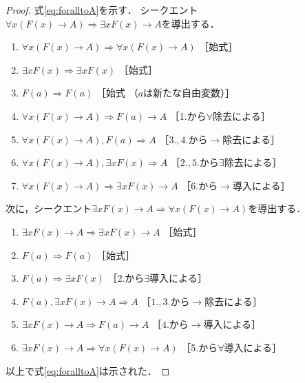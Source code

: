    \begin{proof}
     式\eqref{eq:foralltoA}を示す．
     シークエント$\forall x (F(x) \to A)
     \Longrightarrow \exists x F(x) \to A$を導出する．
     \begin{enumerate}[1. ]
       \item $\forall x (F(x) \to A ) \Longrightarrow 
         \forall x (F(x) \to A)$ \quad ［始式］
       \item $\exists x F(x) \Longrightarrow \exists x F(x)$
         \quad ［始式］
       \item $F(a) \Longrightarrow F(a) $ \quad ［始式
         （$a$は新たな自由変数）］
       \item $\forall x (F(x) \to A) \Longrightarrow F(a) \to A$
         \quad ［1.から$\forall$除去による］
       \item $\forall x (F(x) \to A) , F(a) \Longrightarrow A$
         \quad ［$3.,4.$から$\to$除去による］
       \item $\forall x (F(x) \to A) , \exists x F(x) 
         \Longrightarrow A$
         \quad ［$2.,5.$から$\exists$除去による］
       \item $\forall x (F(x) \to A) \Longrightarrow 
         \exists x F(x) \to A$
         \quad ［6.から$\to$導入による］
     \end{enumerate}
     次に，シークエント$\exists x F(x) \to A \Longrightarrow 
     \forall x (F(x) \to A )$を導出する．
     \begin{enumerate}[1. ]
       \item $\exists x F(x) \to A \Longrightarrow 
         \exists x F(x) \to A$ \quad ［始式］
       \item $F(a) \Longrightarrow F(a)$ \quad ［始式］
       \item $F(a) \Longrightarrow \exists x F(x)$
         \quad ［2.から$\exists$導入による］
       \item $F(a) , \exists x F(x) \to A 
         \Longrightarrow A$
         \quad ［$1.,3.$から$\to$除去による］
       \item $\exists x F(x) \to A \Longrightarrow 
         F(a) \to A$ \quad ［$4.$から$\to$導入による］
       \item $\exists x F(x) \to A \Longrightarrow 
         \forall x (F(x) \to A)$
         \quad ［5.から$\forall$導入による］
     \end{enumerate}
     以上で式\eqref{eq:foralltoA}は示された．




\end{proof}
